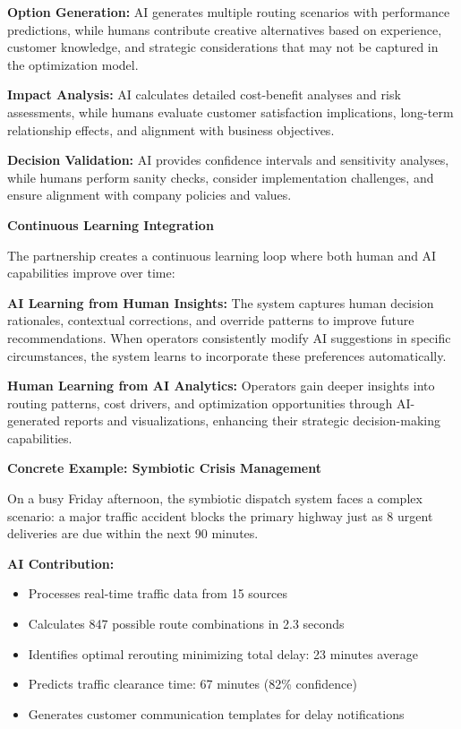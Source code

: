 \documentclass{article}
\begin{document}
\textbf{Option Generation:} AI generates multiple routing scenarios with performance predictions, while humans contribute creative alternatives based on experience, customer knowledge, and strategic considerations that may not be captured in the optimization model.

\textbf{Impact Analysis:} AI calculates detailed cost-benefit analyses and risk assessments, while humans evaluate customer satisfaction implications, long-term relationship effects, and alignment with business objectives.

\textbf{Decision Validation:} AI provides confidence intervals and sensitivity analyses, while humans perform sanity checks, consider implementation challenges, and ensure alignment with company policies and values.

\textbf{Continuous Learning Integration}

The partnership creates a continuous learning loop where both human and AI capabilities improve over time:

\textbf{AI Learning from Human Insights:} The system captures human decision rationales, contextual corrections, and override patterns to improve future recommendations. When operators consistently modify AI suggestions in specific circumstances, the system learns to incorporate these preferences automatically.

\textbf{Human Learning from AI Analytics:} Operators gain deeper insights into routing patterns, cost drivers, and optimization opportunities through AI-generated reports and visualizations, enhancing their strategic decision-making capabilities.

\textbf{Concrete Example: Symbiotic Crisis Management}

On a busy Friday afternoon, the symbiotic dispatch system faces a complex scenario: a major traffic accident blocks the primary highway just as 8 urgent deliveries are due within the next 90 minutes.

\textbf{AI Contribution:}
\begin{itemize}
\item Processes real-time traffic data from 15 sources
\item Calculates 847 possible route combinations in 2.3 seconds  
\item Identifies optimal rerouting minimizing total delay: 23 minutes average
\item Predicts traffic clearance time: 67 minutes (82\% confidence)
\item Generates customer communication templates for delay notifications
\end{itemize}
\end{document}
